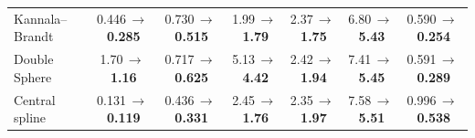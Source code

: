 \begin{tabular*}{\linewidth}{@{\extracolsep{\fill}}lcccccc@{}}
Kannala--Brandt & 0.446\,$\rightarrow$\,\textbf{0.285} & 0.730\,$\rightarrow$\,\textbf{0.515} & 1.99\,$\rightarrow$\,\textbf{1.79} & 2.37\,$\rightarrow$\,\textbf{1.75} & 6.80\,$\rightarrow$\,\textbf{5.43} & 0.590\,$\rightarrow$\,\textbf{0.254} \\
Double Sphere & 1.70\,$\rightarrow$\,\textbf{1.16} & 0.717\,$\rightarrow$\,\textbf{0.625} & 5.13\,$\rightarrow$\,\textbf{4.42} & 2.42\,$\rightarrow$\,\textbf{1.94} & 7.41\,$\rightarrow$\,\textbf{5.45} & 0.591\,$\rightarrow$\,\textbf{0.289} \\
Central spline & 0.131\,$\rightarrow$\,\textbf{0.119} & 0.436\,$\rightarrow$\,\textbf{0.331} & 2.45\,$\rightarrow$\,\textbf{1.76} & 2.35\,$\rightarrow$\,\textbf{1.97} & 7.58\,$\rightarrow$\,\textbf{5.51} & 0.996\,$\rightarrow$\,\textbf{0.538} \\
\bottomrule
\end{tabular*}
